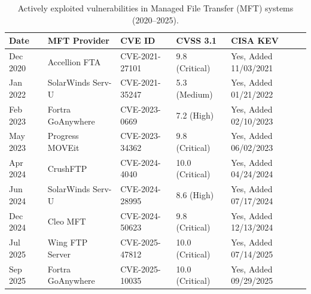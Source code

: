 ﻿\begin{table}[htbp]
    \centering
    \renewcommand{\arraystretch}{1.2}
    \setlength{\tabcolsep}{8pt}
    \caption{Actively exploited vulnerabilities in Managed File Transfer (MFT) systems (2020--2025).}
    \label{tab:mft_hacks}
    \begin{tabular}{lllll} 
        \toprule
        \textbf{Date} & \textbf{MFT Provider} & \textbf{CVE ID} & \textbf{CVSS 3.1} & \textbf{CISA KEV} \\
        \midrule
        Dec 2020 & Accellion FTA & CVE-2021-27101 & 9.8 (Critical) & Yes, Added 11/03/2021 \\
        Jan 2022 & SolarWinds Serv-U & CVE-2021-35247 & 5.3 (Medium) & Yes, Added 01/21/2022 \\
        Feb 2023 & Fortra GoAnywhere & CVE-2023-0669 & 7.2 (High) & Yes, Added 02/10/2023 \\
        May 2023 & Progress MOVEit & CVE-2023-34362 & 9.8 (Critical) & Yes, Added 06/02/2023 \\
        Apr 2024 & CrushFTP & CVE-2024-4040 & 10.0 (Critical) & Yes, Added 04/24/2024 \\
        Jun 2024 & SolarWinds Serv-U & CVE-2024-28995 & 8.6 (High) & Yes, Added 07/17/2024 \\
        Dec 2024 & Cleo MFT & CVE-2024-50623 & 9.8 (Critical) & Yes, Added 12/13/2024 \\
        Jul 2025 & Wing FTP Server & CVE-2025-47812 & 10.0 (Critical) & Yes, Added 07/14/2025 \\
        Sep 2025 & Fortra GoAnywhere & CVE-2025-10035 & 10.0 (Critical) & Yes, Added 09/29/2025 \\
        \bottomrule
    \end{tabular}
\end{table}

